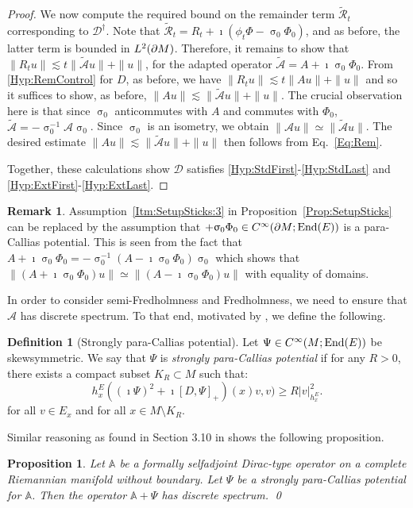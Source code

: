 \documentclass[a4paper,10pt,reqno]{amsart}
\newcommand{\sym}{\upsigma}
\newcommand{\modulus}[1]{|#1|}
\newcommand{\norm}[1]{\| #1 \|}%
\newcommand{\Lp}[2][{}]{{\rm L}^{#2}_{\rm #1}}%
\newcommand{\Ck}[2][{}]{{\rm C}^{#2}_{\rm #1}}%
\DeclareMathOperator{\End}{End} %
\newcommand{\DDD}{\mathscr{D}}%
\newcommand{\AAA}{\mathscr{A}}%
\newcommand{\RRR}{\mathscr{R}}%
\newcommand{\dM}{\partial M}
\newtheorem{proposition}[theorem]{Proposition}
\theoremstyle{definition}
\newtheorem{definition}[theorem]{Definition}
\newtheorem{remark}[theorem]{Remark}
\begin{document}
\begin{proof}
 
We now compute the required bound on the remainder term $\tilde{\RRR}_t$ corresponding to $\DDD^\dagger$.
Note that $ \tilde{\RRR}_t = R_t + \imath (\phi_t \Phi - \sym_0 \Phi_0)$, and as before, the latter term is bounded in $\Lp{2}(\dM)$.
Therefore,  it remains to show that $\norm{R_t u } \lesssim t \norm{\tilde{\AAA}u} + \norm{u}$, for the adapted operator  $\tilde{\AAA} =A+\imath \sym_0\Phi_0$.
From \ref{Hyp:RemControl} for $D$, as before, we have $\norm{R_t u} \lesssim t\norm{A u} + \norm{u}$ and so it suffices to show, as before, $\norm{A u} \lesssim \norm{\tilde{\AAA} u}  + \norm{u}$.
The crucial observation here is that since $\sym_0$ anticommutes with $A$ and commutes with  $\Phi_0$, $\tilde{\AAA} = -\sym_0^{-1} \AAA \sym_0$.
Since $\sym_0$ is an isometry, we obtain  $\norm{\AAA u} \simeq \norm{\tilde{\AAA} u}$. 
The desired estimate $\norm{A u} \lesssim \norm{\tilde{\AAA} u} + \norm{u}$ then follows from Eq.~\eqref{Eq:Rem}.

Together, these calculations show $\DDD$ satisfies \ref{Hyp:StdFirst}-\ref{Hyp:StdLast} and \ref{Hyp:ExtFirst}-\ref{Hyp:ExtLast}.

\end{proof} 


\begin{remark}
\label{Rem:paraCallias} 
Assumption~\ref{Itm:SetupSticks:3} in Proposition~\ref{Prop:SetupSticks} can be replaced by the assumption that $+\sym_0 \Phi_0 \in \Ck{\infty}(\dM;\End(E))$ is a para-Callias potential.
This is seen from the fact that $A+\imath \sym_0\Phi_0 = -\sym_0^{-1} (A - \imath \sym_0 \Phi_0) \sym_0$ which shows that $\norm{(A + \imath \sym_0 \Phi_0)u} \simeq \norm{(A - \imath \sym_0 \Phi_0)u}$ with equality of domains.
\end{remark}


In order to consider semi-Fredholmness and Fredholmness, we need to ensure that $\AAA$ has discrete spectrum.
To that end, motivated by \cite{BS0}, we define the following. 

\begin{definition}[Strongly para-Callias potential]
Let $\Psi \in \Ck{\infty}(M;\End(E))$ be skewsymmetric. 
We say that $\Psi$ is \emph{strongly para-Callias potential} if  for any $R > 0$, there exists a compact subset $K_R \subset M$ such that:
$$ h^E_x ( (\imath \Psi)^2+ \imath  [D,\Psi]_+)(x) v,v) \geq R \modulus{v}_{h^E_x}^2.$$
for all $v \in E_x$ and for all $x \in M \setminus K_R$.
\end{definition}

Similar reasoning as found in Section 3.10 in \cite{BS0} shows the following proposition.
\begin{proposition}
\label{Prop:DiscreteSpecA}
Let $\mathbb{A}$ be a formally selfadjoint Dirac-type operator on a complete Riemannian manifold without boundary.
Let $\Psi$ be a strongly para-Callias potential for $\mathbb{A}$.
Then the operator $\mathbb{A}+\Psi$ has discrete spectrum. 
\hfill\qed
\end{proposition} 
\end{document}
